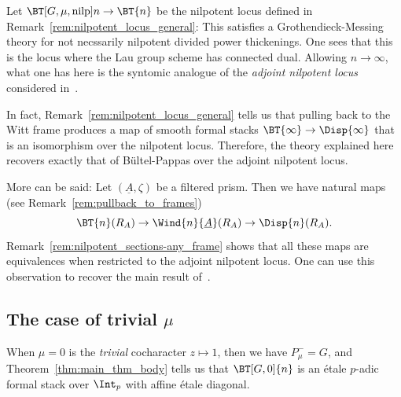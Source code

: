 \documentclass[10pt]{amsart}
\begin{document}
\begin{remark}
\label{rem:adjoint_nilpotent_locus}
Let $\BT[G,\mu,\mathrm{nilp}]{n}\to \BT{n}$ be the nilpotent locus defined in Remark~\ref{rem:nilpotent_locus_general}: This satisfies a Grothendieck-Messing theory for not necssarily nilpotent divided power thickenings. One sees that this is the locus where the Lau group scheme has connected dual. Allowing $n\to \infty$, what one has here is the syntomic analogue of the \emph{adjoint nilpotent locus} considered in~\cite[\S 3.5]{MR4120808}.  

In fact, Remark~\ref{rem:nilpotent_locus_general} tells us that pulling back to the Witt frame produces a map of smooth formal stacks $\BT{\infty}\to \Disp{\infty}$ that is an isomorphism over the nilpotent locus. Therefore, the theory explained here recovers exactly that of B\"ultel-Pappas over the adjoint nilpotent locus.

More can be said: Let $(\underline{A},\zeta)$ be a filtered prism. Then we have natural maps (see Remark~\ref{rem:pullback_to_frames}) 
\[
\BT{n}(R_A)\to \Wind{n}{\underline{A}}(R_A)\to \Disp{n}(R_A).
\]
Remark~\ref{rem:nilpotent_sections-any_frame} shows that all these maps are equivalences when restricted to the adjoint nilpotent locus. One can use this observation to recover the main result of~\cite{bueltel2020gmuwindowsdeformationsgmudisplays}.
\end{remark}   



\subsection{The case of trivial $\mu$}
\label{subsec:trivial_mu}

When $\mu = 0$ is the \emph{trivial} cocharacter $z\mapsto 1$, then we have $P^-_\mu = G$, and Theorem~\ref{thm:main_thm_body} tells us that $\BT[G,0]{n}$ is an \'etale $p$-adic formal stack over $\Int_p$ with affine \'etale diagonal.
\end{document}
